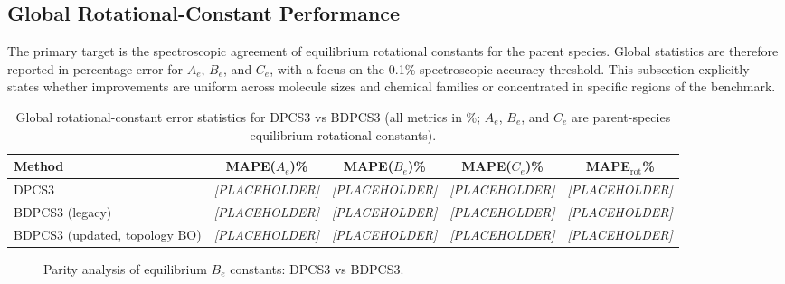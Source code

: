 \documentclass[journal=jctcce,manuscript=article]{achemso}
\begin{document}
\subsection{Global Rotational-Constant Performance}
The primary target is the spectroscopic agreement of equilibrium rotational constants for the parent species. Global statistics are therefore reported in percentage error for $A_e$, $B_e$, and $C_e$, with a focus on the 0.1\% spectroscopic-accuracy threshold.
This subsection explicitly states whether improvements are uniform across molecule sizes and chemical families or concentrated in specific regions of the benchmark.

\begin{table}[ht]
\caption{Global rotational-constant error statistics for DPCS3 vs BDPCS3 (all metrics in \%; $A_e$, $B_e$, and $C_e$ are parent-species equilibrium rotational constants).}
\label{tab:global_rot_stats}
\centering
\begin{tabular}{lcccc}
\toprule
Method & MAPE($A_e$)\% & MAPE($B_e$)\% & MAPE($C_e$)\% & MAPE$_\mathrm{rot}$\% \\
\midrule
DPCS3 & \textit{[PLACEHOLDER]} & \textit{[PLACEHOLDER]} & \textit{[PLACEHOLDER]} & \textit{[PLACEHOLDER]} \\
BDPCS3 (legacy) & \textit{[PLACEHOLDER]} & \textit{[PLACEHOLDER]} & \textit{[PLACEHOLDER]} & \textit{[PLACEHOLDER]} \\
BDPCS3 (updated, topology BO) & \textit{[PLACEHOLDER]} & \textit{[PLACEHOLDER]} & \textit{[PLACEHOLDER]} & \textit{[PLACEHOLDER]} \\
\bottomrule
\end{tabular}
\end{table}

\begin{figure}[ht]
\centering
{}
\caption{Parity analysis of equilibrium $B_e$ constants: DPCS3 vs BDPCS3.}
\label{fig:parity_be}
\end{figure}
\end{document}
